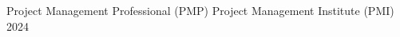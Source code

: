 
\begin{cvhonors}

  \cvhonor
    {Project Management Professional (PMP)} %
    {Project Management Institute (PMI)} %
    {} %
    {2024} %

\end{cvhonors}

